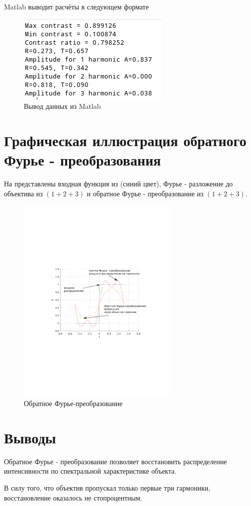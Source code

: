 \documentclass[14pt,a4paper]{extarticle}
\begin{document}
Matlab выводит расчёты в следующем формате
\begin{figure}[H]
	\centering
	\includegraphics[width=0.7\linewidth]{matlab}
	\caption{Вывод данных из Matlab}
\end{figure}

\section{Графическая иллюстрация обратного Фурье - преобразования}
На  представлены входная функция из  (синий цвет), Фурье - разложение до объектива из  $(1+2+3)$ и обратное Фурье - преобразование из  $(1+2+3)$.
\begin{figure}[H]
	\centering
		\includegraphics[trim=100 240 100 250,clip, width=0.7\textwidth]{fig5-1e.pdf}\caption{Обратное Фурье-преобразование}\label{summa}
\end{figure}

\section{Выводы}
Обратное Фурье - преобразование позволяет восстановить распределение интенсивности по спектральной характеристике объекта.

В силу того, что объектив пропускал только первые три гармоники, восстановление оказалось не стопроцентным.
\end{document}
